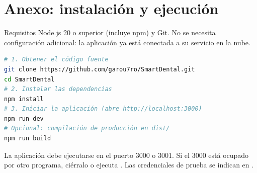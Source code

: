 \documentclass[11pt]{article}
\begin{document}
\clearpage
\appendix
\section{Anexo: instalación y ejecución}\label{anx:instalacion}

\begin{sdpaso}{Requisitos}
Node.js 20 o superior (incluye npm) y Git. No se necesita configuración adicional: la aplicación ya está conectada a su servicio en la nube.
\end{sdpaso}

\begin{lstlisting}[language=bash,caption={Instalación y ejecución local},label=lst:instalacion]
# 1. Obtener el código fuente
git clone https://github.com/garou7ro/SmartDental.git
cd SmartDental
# 2. Instalar las dependencias
npm install
# 3. Iniciar la aplicación (abre http://localhost:3000)
npm run dev
# Opcional: compilación de producción en dist/
npm run build
\end{lstlisting}

\begin{sdaviso}
La aplicación debe ejecutarse en el puerto 3000 o 3001. Si el 3000 está ocupado por otro programa, ciérralo o ejecuta . Las credenciales de prueba se indican en .
\end{sdaviso}
\end{document}

